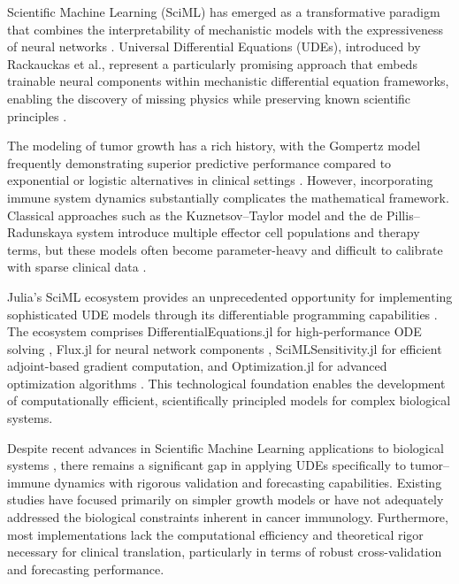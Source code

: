 \documentclass{juliacon}
\begin{document}
Scientific Machine Learning (SciML) has emerged as a transformative paradigm that combines the interpretability of mechanistic models with the expressiveness of neural networks \cite{rackauckas2020ude,karniadakis2021physics}. Universal Differential Equations (UDEs), introduced by Rackauckas et al., represent a particularly promising approach that embeds trainable neural components within mechanistic differential equation frameworks, enabling the discovery of missing physics while preserving known scientific principles \cite{raissi2019pinn}.

The modeling of tumor growth has a rich history, with the Gompertz model frequently demonstrating superior predictive performance compared to exponential or logistic alternatives in clinical settings \cite{vaghi2020gompertz}. However, incorporating immune system dynamics substantially complicates the mathematical framework. Classical approaches such as the Kuznetsov--Taylor model and the de Pillis--Radunskaya system introduce multiple effector cell populations and therapy terms, but these models often become parameter-heavy and difficult to calibrate with sparse clinical data \cite{kuznetsov1994,depillis2005validated}.

Julia's SciML ecosystem provides an unprecedented opportunity for implementing sophisticated UDE models through its differentiable programming capabilities \cite{bezanson2017julia,innes2019differentiable}. The ecosystem comprises DifferentialEquations.jl for high-performance ODE solving \cite{rackauckas2017de}, Flux.jl for neural network components \cite{innes2018flux}, SciMLSensitivity.jl for efficient adjoint-based gradient computation, and Optimization.jl for advanced optimization algorithms \cite{rackauckas2019diffeqflux}. This technological foundation enables the development of computationally efficient, scientifically principled models for complex biological systems.

Despite recent advances in Scientific Machine Learning applications to biological systems \cite{shen2023differentiable,aboelyazeed2023differentiable}, there remains a significant gap in applying UDEs specifically to tumor--immune dynamics with rigorous validation and forecasting capabilities. Existing studies have focused primarily on simpler growth models or have not adequately addressed the biological constraints inherent in cancer immunology. Furthermore, most implementations lack the computational efficiency and theoretical rigor necessary for clinical translation, particularly in terms of robust cross-validation and forecasting performance.
\end{document}

